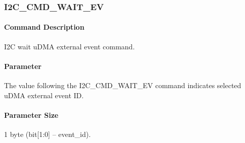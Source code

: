 \subsubsection{I2C\_CMD\_WAIT\_EV}
\paragraph{Command Description}
I2C wait uDMA external event command.
\paragraph{Parameter}
The value following the I2C\_CMD\_WAIT\_EV command indicates selected uDMA external event ID.
\paragraph{Parameter Size}
1 byte (bit[1:0] – event\_id).
